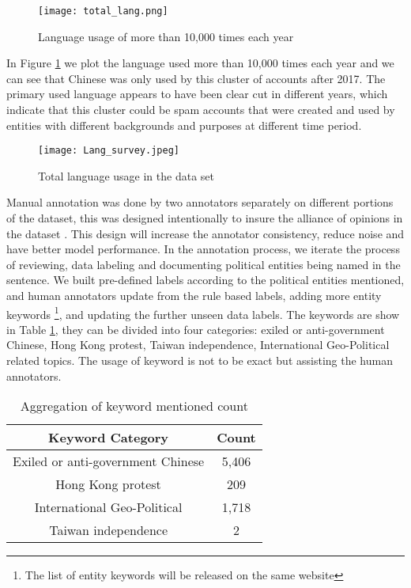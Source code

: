 \documentclass[sigconf]{acmart}
\begin{document}
\begin{figure}[ht]
  \centering
  \texttt{[image: total\_lang.png]}
  \caption{Language usage of more than 10,000 times each year}
  \label{fig:lang_used}
\end{figure}

In Figure \ref{fig:lang_used} we plot the language used more than 10,000 times each year and we can see that Chinese was only used by this cluster of accounts after 2017. The primary used language appears to have been clear cut in different years, which indicate that this cluster could be spam accounts that were created and used by entities with different backgrounds and purposes at different time period. 

\begin{figure}[ht]
  \centering
  \texttt{[image: Lang\_survey.jpeg]}
  \caption{Total language usage in the data set}
  \label{fig:total_lang}
\end{figure}

Manual annotation was done by two annotators separately on different portions of the dataset, this was designed intentionally to insure the alliance of opinions in the dataset \cite{gordon2021disagreement}. This design will increase the annotator consistency, reduce noise and have better model performance. In the annotation process, we iterate the process of reviewing, data labeling and documenting political entities being named in the sentence. We built pre-defined labels according to the political entities mentioned, and human annotators update from the rule based labels, adding more entity keywords \footnote{The list of entity keywords will be released on the same website}, and updating the further unseen data labels. The keywords are show in Table \ref{tab:key}, they can be divided into four categories: exiled or anti-government Chinese, Hong Kong protest, Taiwan independence, International Geo-Political related topics. The usage of keyword is not to be exact but assisting the human annotators.

\begin{table}[ht]
  \caption{Aggregation of keyword mentioned count}
  \label{tab:key}
  \begin{tabular}{cc}
    \toprule
    Keyword Category & Count \\
    \midrule
    Exiled or anti-government Chinese & 5,406 \\
    Hong Kong protest & 209 \\
    International Geo-Political & 1,718 \\
    Taiwan independence & 2 \\
  \bottomrule
\end{tabular}
\end{table}
\end{document}
